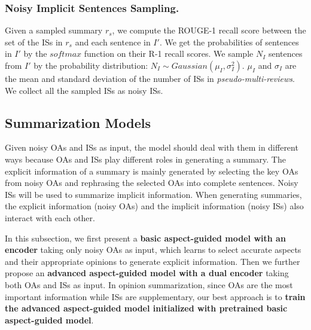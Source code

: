 \subsubsection{Noisy Implicit Sentences Sampling.}
Given a sampled summary $r_s$, 
we compute the ROUGE-1 recall score between the set of the ISs in $r_s$
and each sentence in $I'$.
We get the probabilities of sentences in $I'$
by the $softmax$ function on their R-1 recall scores. 
We sample $N_{I}$ sentences from $I'$ by
the probability distribution:
$N_{I} \sim Gaussian(\mu_{I}, \sigma_{I}^2)$.
$\mu_{I}$ and $\sigma_{I}$ are the mean and standard deviation of 
the number of ISs in {\em pseudo-multi-reviews}.
We collect all the sampled ISs as noisy ISs.


\subsection{Summarization Models}
\label{sec:model}


Given noisy OAs and ISs as input, the model should deal with them in different ways 
because OAs and ISs play different roles in generating a summary.
The explicit information of a summary is mainly generated by selecting the key OAs from noisy OAs and 
rephrasing the selected OAs into complete sentences.
Noisy ISs will be used to summarize implicit information.
When generating summaries, 
the explicit information (noisy OAs) and the implicit information (noisy ISs) also interact with each other.

In this subsection, we first present a \textbf{basic aspect-guided model with an encoder} taking only noisy OAs as input, which learns to select accurate aspects and their appropriate opinions 
to generate explicit information.
Then we further propose an {\bf advanced aspect-guided model with a dual encoder} taking both OAs and ISs as input.
In opinion summarization, 
since OAs are the most important information while ISs are supplementary, 
our best approach is to \textbf{train the advanced aspect-guided model initialized with pretrained basic aspect-guided model}.


